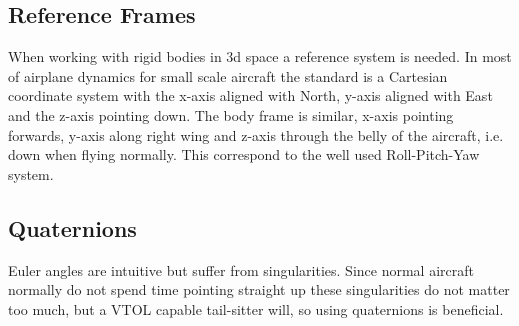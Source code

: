 \documentclass{article}
\begin{document}
\subsection{Reference Frames}
When working with rigid bodies in 3d space a reference system is needed.
In most of airplane dynamics for small scale aircraft the standard is a Cartesian coordinate system with the x-axis aligned with North, y-axis aligned with East and the z-axis pointing down.
The body frame is similar, x-axis pointing forwards, y-axis along right wing and z-axis through the belly of the aircraft, i.e. down when flying normally.
This correspond to the well used Roll-Pitch-Yaw system.\cite{nelson}

\subsection{Quaternions}
Euler angles are intuitive but suffer from singularities.
Since normal aircraft normally do not spend time pointing straight up these singularities do not matter too much, but a VTOL capable tail-sitter will, so using quaternions is beneficial.
\end{document}
